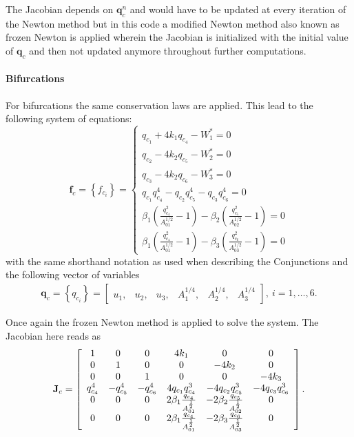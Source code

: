 \documentclass[a4paper, oneside]{discothesis}
\begin{document}
The Jacobian depends on $\mathbf{q}_c^n$ and would have to be updated at every iteration of the Newton method but in this code a modified Newton method also known as frozen Newton is applied wherein the Jacobian is initialized with the initial value of $\mathbf{q}_c$ and then not updated anymore throughout further computations.
\paragraph{Bifurcations} \label{par:bifurcations}
For bifurcations the same conservation laws are applied.
This lead to the following system of equations:
$$
\mathbf{f}_c=\left\{f_{c_i}\right\}=\left\{\begin{array}{l}
		q_{c_1}+4 k_1 q_{c_4}-W_1^*=0 \\
		q_{c_2}-4 k_2 q_{c_5}-W_2^*=0 \\
		q_{c_3}-4 k_2 q_{c_6}-W_3^*=0 \\
		q_{c_1} q_{c_4}^4-q_{c_2} q_{c_5}^4-q_{c_3} q_{c_6}^4=0 \\
		\beta_1\left(\frac{q_{c_4}^2}{A_{01}^{1 / 2}}-1\right)-\beta_2\left(\frac{q_{c_5}^2}{A_{02}^{1 / 2}}-1\right)=0 \\
		\beta_1\left(\frac{q_{c_4}^2}{A_{01}^{1 / 2}}-1\right)-\beta_3\left(\frac{q_{c_6}^2}{A_{03}^{1 / 2}}-1\right)=0 
\end{array}\right. \label{syseq_bif}
$$
with the same shorthand notation as used when describing the Conjunctions and the following vector of variables
$$
\begin{aligned}
 \mathbf{q}_c=\left\{q_{c_i}\right\}=\left[\begin{array}{llllll}
		u_1, & u_2, & u_3, & A_1^{1 / 4}, & A_2^{1 / 4}, & A_3^{1 / 4}
\end{array}\right], \ i=1, \ldots, 6. 
\end{aligned}
$$

Once again the frozen Newton method is applied to solve the system.
The Jacobian here reads as
$$\mathbf{J}_{c}=\left[\begin{array}{c c c c c c}
		1&0&0&4k_1&0&0\\
		0&1&0&0&-4k_2&0\\
		0&0&1&0&0&-4k_3\\
		q_{c_4}^4 & -q_{c_5}^4 & -q_{c_6}^4 & 4q_{c_1}q_{c_4}^3 & -4q_{c_2}q_{c_5}^3 & -4q_{c_3}q_{c_6}^3 \\
		0 & 0 & 0 & 2\beta_1\frac{q_{c_4}}{A_{01}^{\frac{1}{2}}} & -2\beta_2\frac{q_{c_5}}{A_{02}^{\frac{1}{2}}} & 0\\
		0 & 0 & 0 & 2\beta_1\frac{q_{c_4}}{A_{01}^{\frac{1}{2}}} & -2\beta_3\frac{q_{c_6}}{A_{03}^{\frac{1}{2}}} & 0\\
	\end{array} 
\right].
$$
\end{document}
